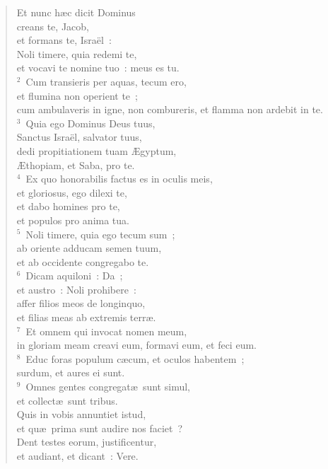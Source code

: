 \begin{flushleft}\begin{verse}\vspace{-19pt}\hspace{6pt}Et nunc h\ae c dicit Dominus\\\hspace{6pt} creans te, Jacob,\\ et formans te, Isra\"el~:\\ Noli timere, quia redemi te,\\ et vocavi te nomine tuo~: meus es tu.\\
${}^{2}$~Cum transieris per aquas, tecum ero,\\ et flumina non operient te~;\\ cum ambulaveris in igne, non combureris, et flamma non ardebit in te.\\
${}^{3}$~Quia ego Dominus Deus tuus,\\ Sanctus Isra\"el, salvator tuus,\\ dedi propitiationem tuam \AE gyptum,\\ \AE thopiam, et Saba, pro te.\\
${}^{4}$~Ex quo honorabilis factus es in oculis meis,\\ et gloriosus, ego dilexi te,\\ et dabo homines pro te,\\ et populos pro anima tua.\\
${}^{5}$~Noli timere, quia ego tecum sum~;\\ ab oriente adducam semen tuum,\\ et ab occidente congregabo te.\\
${}^{6}$~Dicam aquiloni~: Da~;\\ et austro~: Noli prohibere~:\\ affer filios meos de longinquo,\\ et filias meas ab extremis terr\ae .\\
${}^{7}$~Et omnem qui invocat nomen meum,\\ in gloriam meam creavi eum, formavi eum, et feci eum.\\
${}^{8}$~Educ foras populum c\ae cum, et oculos habentem~;\\ surdum, et aures ei sunt.\\
${}^{9}$~Omnes gentes congregat\ae\ sunt simul,\\ et collect\ae\ sunt tribus.\\ Quis in vobis annuntiet istud,\\ et qu\ae\ prima sunt audire nos faciet~?\\ Dent testes eorum, justificentur,\\ et audiant, et dicant~: Vere.\\

\end{verse}
\end{flushleft}

